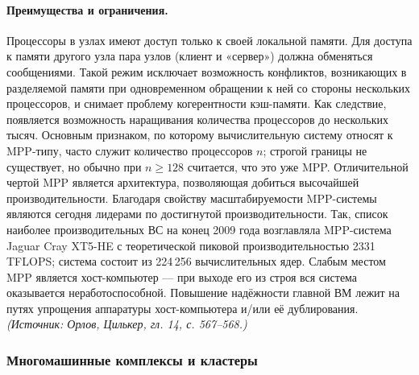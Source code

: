 \documentclass[a4paper,12pt]{article}
\begin{document}
\paragraph{Преимущества и ограничения.}
Процессоры в узлах имеют доступ только к своей локальной памяти. Для доступа к памяти другого узла пара узлов (клиент и «сервер») должна обменяться сообщениями. Такой режим исключает возможность конфликтов, возникающих в разделяемой памяти при одновременном обращении к ней со стороны нескольких процессоров, и снимает проблему когерентности кэш-памяти. Как следствие, появляется возможность наращивания количества процессоров до нескольких тысяч. Основным признаком, по которому вычислительную систему относят к MPP-типу, часто служит количество процессоров \(n\); строгой границы не существует, но обычно при \(n\ge128\) считается, что это уже MPP. Отличительной чертой MPP является архитектура, позволяющая добиться высочайшей производительности. Благодаря свойству масштабируемости MPP-системы являются сегодня лидерами по достигнутой производительности. Так, список наиболее производительных ВС на конец 2009 года возглавляла MPP-система Jaguar Cray XT5-HE с теоретической пиковой производительностью 2331 TFLOPS; система состоит из 224\,256 вычислительных ядер. Слабым местом MPP является хост-компьютер — при выходе его из строя вся система оказывается неработоспособной. Повышение надёжности главной ВМ лежит на путях упрощения аппаратуры хост-компьютера и/или её дублирования.
\textit{(Источник: Орлов, Цилькер, гл. 14, с. 567--568.)}

\subsubsection{Многомашинные комплексы и кластеры}
\end{document}

